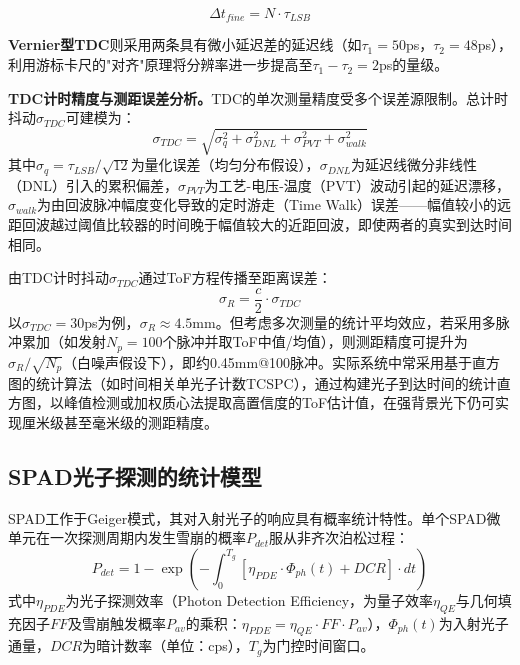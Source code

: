 \documentclass[12pt,a4paper,openany,UTF8]{ctexbook}
\begin{document}
\begin{equation}\label{eq:tdc_fine}
\Delta t_{fine} = N \cdot \tau_{LSB}
\end{equation}

\textbf{Vernier型TDC}则采用两条具有微小延迟差的延迟线（如$\tau_1 = 50$ps，$\tau_2 = 48$ps），利用游标卡尺的"对齐"原理将分辨率进一步提高至$\tau_1 - \tau_2 = 2$ps的量级。

\textbf{TDC计时精度与测距误差分析。}TDC的单次测量精度受多个误差源限制。总计时抖动$\sigma_{TDC}$可建模为：
\begin{equation}\label{eq:tdc_jitter}
\sigma_{TDC} = \sqrt{\sigma_{q}^2 + \sigma_{DNL}^2 + \sigma_{PVT}^2 + \sigma_{walk}^2}
\end{equation}
其中$\sigma_{q} = \tau_{LSB}/\sqrt{12}$为量化误差（均匀分布假设），$\sigma_{DNL}$为延迟线微分非线性（DNL）引入的累积偏差，$\sigma_{PVT}$为工艺-电压-温度（PVT）波动引起的延迟漂移，$\sigma_{walk}$为由回波脉冲幅度变化导致的定时游走（Time Walk）误差——幅值较小的远距回波越过阈值比较器的时间晚于幅值较大的近距回波，即使两者的真实到达时间相同。

由TDC计时抖动$\sigma_{TDC}$通过ToF方程传播至距离误差：
\begin{equation}\label{eq:tdc_range_err}
\sigma_R = \frac{c}{2} \cdot \sigma_{TDC}
\end{equation}
以$\sigma_{TDC} = 30$ps为例，$\sigma_R \approx 4.5$mm。但考虑多次测量的统计平均效应，若采用多脉冲累加（如发射$N_p = 100$个脉冲并取ToF中值/均值），则测距精度可提升为$\sigma_R/\sqrt{N_p}$（白噪声假设下），即约0.45mm@100脉冲。实际系统中常采用基于直方图的统计算法（如时间相关单光子计数TCSPC），通过构建光子到达时间的统计直方图，以峰值检测或加权质心法提取高置信度的ToF估计值，在强背景光下仍可实现厘米级甚至毫米级的测距精度。

\subsection{SPAD光子探测的统计模型}

SPAD工作于Geiger模式，其对入射光子的响应具有概率统计特性。单个SPAD微单元在一次探测周期内发生雪崩的概率$P_{det}$服从非齐次泊松过程：
\begin{equation}\label{eq:spad_prob}
P_{det} = 1 - \exp\left(-\int_{0}^{T_g} [\eta_{PDE} \cdot \Phi_{ph}(t) + DCR] \cdot dt\right)
\end{equation}
式中$\eta_{PDE}$为光子探测效率（Photon Detection Efficiency，为量子效率$\eta_{QE}$与几何填充因子$FF$及雪崩触发概率$P_{av}$的乘积：$\eta_{PDE} = \eta_{QE} \cdot FF \cdot P_{av}$），$\Phi_{ph}(t)$为入射光子通量，$DCR$为暗计数率（单位：cps），$T_g$为门控时间窗口。
\end{document}
